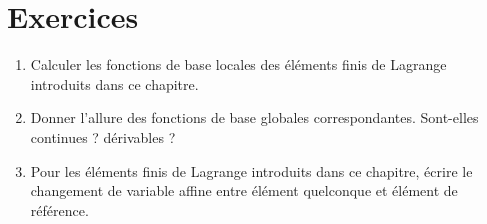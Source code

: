 \section{Exercices}
%
\begin{enumerate}
\item Calculer les fonctions de base locales des éléments finis de Lagrange introduits dans ce chapitre.
\item Donner l'allure des fonctions de base globales correspondantes. Sont-elles continues ? dérivables ?
\item Pour les éléments finis de Lagrange introduits dans ce chapitre, écrire le changement de variable affine entre élément quelconque et élément de référence.
\end{enumerate}


